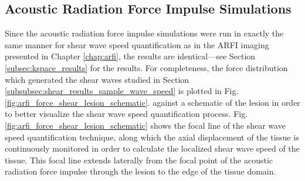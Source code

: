 		\subsection{Acoustic Radiation Force Impulse Simulations}
			Since the acoustic radiation force impulse simulations were run in exactly the same manner for shear wave speed quantification as in the ARFI imaging presented in Chapter \ref{chap:arfi}, the results are identical---see Section \ref{subsec:kspace_results} for the results. For completeness, the force distribution which generated the shear waves studied in Section \ref{subsubsec:shear_results_sample_wave_speed} is plotted in Fig. \ref{fig:arfi_force_shear_lesion_schematic}. against a schematic of the lesion in order to better visualize the shear wave speed quantification process. Fig. \ref{fig:arfi_force_shear_lesion_schematic} shows the focal line of the shear wave speed quantification technique, along which the axial displacement of the tissue is continuously monitored in order to calculate the localized shear wave speed of the tissue. This focal line extends laterally from the focal point of the acoustic radiation force impulse through the lesion to the edge of the tissue domain.

